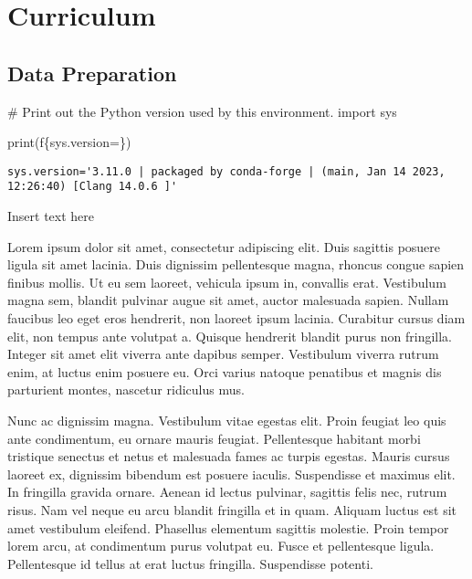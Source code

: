 \documentclass[
  letterpaper,
  DIV=11,
  numbers=noendperiod]{scrreprt}
\newenvironment{Shaded}{\begin{snugshade}}{\end{snugshade}}
\newcommand{\BuiltInTok}[1]{\textcolor[rgb]{0.00,0.23,0.31}{#1}}
\newcommand{\CommentTok}[1]{\textcolor[rgb]{0.37,0.37,0.37}{#1}}
\newcommand{\ImportTok}[1]{\textcolor[rgb]{0.00,0.46,0.62}{#1}}
\newcommand{\NormalTok}[1]{\textcolor[rgb]{0.00,0.23,0.31}{#1}}
\newcommand{\OperatorTok}[1]{\textcolor[rgb]{0.37,0.37,0.37}{#1}}
\newcommand{\SpecialCharTok}[1]{\textcolor[rgb]{0.37,0.37,0.37}{#1}}
\newcommand{\SpecialStringTok}[1]{\textcolor[rgb]{0.13,0.47,0.30}{#1}}
\begin{document}
\part{Curriculum}

\chapter{Data Preparation}\label{data-preparation}

\begin{Shaded}
\begin{Highlighting}[]
\CommentTok{\# Print out the Python version used by this environment.}
\ImportTok{import}\NormalTok{ sys}

\BuiltInTok{print}\NormalTok{(}\SpecialStringTok{f\textquotesingle{}}\SpecialCharTok{\{}\NormalTok{sys}\SpecialCharTok{.}\NormalTok{version}\OperatorTok{=}\SpecialCharTok{\}}\SpecialStringTok{\textquotesingle{}}\NormalTok{)}
\end{Highlighting}
\end{Shaded}

\begin{verbatim}
sys.version='3.11.0 | packaged by conda-forge | (main, Jan 14 2023, 12:26:40) [Clang 14.0.6 ]'
\end{verbatim}

Insert text here

Lorem ipsum dolor sit amet, consectetur adipiscing elit. Duis sagittis
posuere ligula sit amet lacinia. Duis dignissim pellentesque magna,
rhoncus congue sapien finibus mollis. Ut eu sem laoreet, vehicula ipsum
in, convallis erat. Vestibulum magna sem, blandit pulvinar augue sit
amet, auctor malesuada sapien. Nullam faucibus leo eget eros hendrerit,
non laoreet ipsum lacinia. Curabitur cursus diam elit, non tempus ante
volutpat a. Quisque hendrerit blandit purus non fringilla. Integer sit
amet elit viverra ante dapibus semper. Vestibulum viverra rutrum enim,
at luctus enim posuere eu. Orci varius natoque penatibus et magnis dis
parturient montes, nascetur ridiculus mus.

Nunc ac dignissim magna. Vestibulum vitae egestas elit. Proin feugiat
leo quis ante condimentum, eu ornare mauris feugiat. Pellentesque
habitant morbi tristique senectus et netus et malesuada fames ac turpis
egestas. Mauris cursus laoreet ex, dignissim bibendum est posuere
iaculis. Suspendisse et maximus elit. In fringilla gravida ornare.
Aenean id lectus pulvinar, sagittis felis nec, rutrum risus. Nam vel
neque eu arcu blandit fringilla et in quam. Aliquam luctus est sit amet
vestibulum eleifend. Phasellus elementum sagittis molestie. Proin tempor
lorem arcu, at condimentum purus volutpat eu. Fusce et pellentesque
ligula. Pellentesque id tellus at erat luctus fringilla. Suspendisse
potenti.
\end{document}
